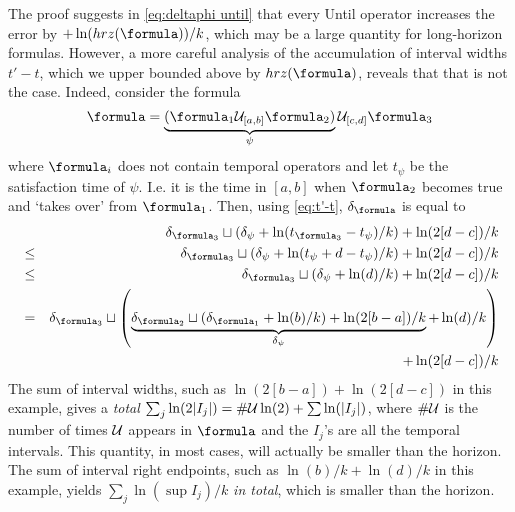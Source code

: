 \begin{rem}
	\label{rem:upper bound}
	The proof suggests in \eqref{eq:deltaphi until} that every Until operator increases the error by $+\ln(hrz(\formula))/k$, which may be a large quantity for long-horizon formulas.
	However, a more careful analysis of the accumulation of interval widths $t'-t$, which we upper bounded above by $hrz(\formula)$, reveals that that is not the case.
	Indeed, consider the formula
	\[\formula = \underbrace{(\formula_1 \until_{[a,b]} \formula_2) }_{\psi}\until_{[c,d]} \formula_3\]
	where $\formula_i$ does not contain temporal operators and let $t_\psi$ be the satisfaction time of $\psi$. 
	I.e. it is the time in $[a,b]$ when $\formula_2$ becomes true and `takes over' from $\formula_1$.
	Then, using \eqref{eq:t'-t}, $\delta_{\formula}$ is equal to
	\begin{eqnarray*}
	 && \delta_{\formula_3} \sqcup ( \delta_{\psi} + \ln(t_{\formula_3} - t_\psi)/k )+ \ln(2[d-c])/k 
	\\
	&\leq& \delta_{\formula_3} \sqcup ( \delta_{\psi} + \ln(t_\psi + d - t_\psi)/k )+ \ln(2[d-c])/k 
	\\
	&\leq& \delta_{\formula_3} \sqcup ( \delta_{\psi} + \ln(d)/k )+ \ln(2[d-c])/k 
	\\
	&=& \delta_{\formula_3} \sqcup \left( \underbrace{\delta_{\formula_2} \sqcup ( \delta_{\formula_1} + \ln(b)/k )+ \ln(2[b-a])/k }_{\delta_\psi} + \ln(d)/k \right)
	\\
	&& \quad + \ln(2[d-c])/k 
	\end{eqnarray*}
	The sum of interval widths, such as $\ln(2[b-a])+\ln(2[d-c])$ in this example, gives a \textit{total} $\sum_j\ln(2|I_j|) = \#\mathcal{U}\ln(2) +  \sum\ln(|I_j|)$, where $\#\mathcal{U}$ is the number of times $\mathcal{U}$ appears in $\formula$ and the $I_j$'s are all the temporal intervals. 
	This quantity, in most cases, will actually be smaller than the horizon.
	The sum of interval right endpoints, such as $\ln(b)/k + \ln(d)/k$ in this example, yields $\sum_j \ln(\sup I_j)/k$ \textit{in total}, which is smaller than the horizon.
\end{rem}
